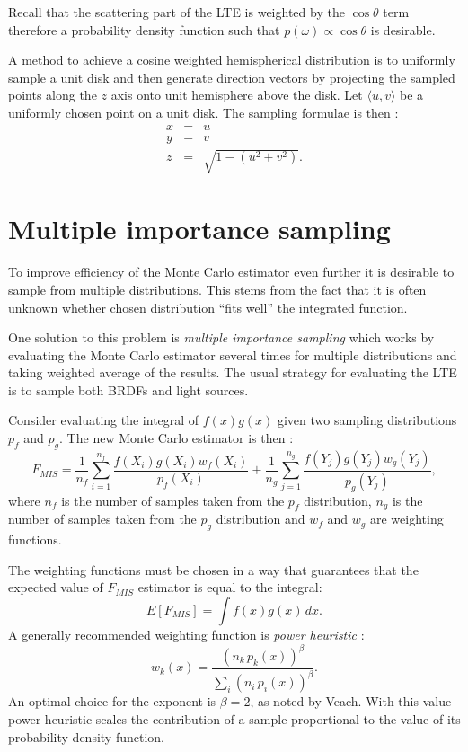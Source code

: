 Recall that the scattering part of the LTE is weighted by the $\cos\theta$ term therefore a probability density function such that $p(\omega) \propto \cos\theta$ is desirable.

A method to achieve a cosine weighted hemispherical distribution is to uniformly sample a unit disk and then generate direction vectors by projecting the sampled points along the $z$ axis onto unit hemisphere above the disk.
Let $\langle u, v \rangle$ be a uniformly chosen point on a unit disk. The sampling formulae is then \parencite{shirley97}:
\begin{eqnarray}
  x &=& u \nonumber \\
  y &=& v \nonumber \\
  z &=& \sqrt{1 - (u^{2} + v^{2})}.
\end{eqnarray}

\section{Multiple importance sampling}
To improve efficiency of the Monte Carlo estimator even further it is desirable to sample from multiple distributions. This stems from the fact that it is often unknown whether chosen distribution ``fits well'' the integrated function.

One solution to this problem is \emph{multiple importance sampling} which works by evaluating the Monte Carlo estimator several times for multiple distributions and taking weighted average of the results. The usual strategy for evaluating the LTE is to sample both BRDFs and light sources.

Consider evaluating the integral of $f(x)g(x)$ given two sampling distributions $p_{f}$ and $p_{g}$. The new Monte Carlo estimator is then \parencite{phar2010}:
\begin{equation}
  F_{MIS} = 
  \frac{1}{n_{f}} \sum_{i=1}^{n_{f}} \frac{f(X_{i})g(X_{i})w_{f}(X_{i})}{p_{f}(X_{i})} + 
  \frac{1}{n_{g}} \sum_{j=1}^{n_{g}} \frac{f(Y_{j})g(Y_{j})w_{g}(Y_{j})}{p_{g}(Y_{j})},
\end{equation}
where $n_{f}$ is the number of samples taken from the $p_{f}$ distribution, $n_{g}$ is the number of samples taken from the $p_{g}$ distribution and $w_{f}$ and $w_{g}$ are weighting functions.

The weighting functions must be chosen in a way that guarantees that the expected value of $F_{MIS}$ estimator is equal to the integral:
\begin{equation}
  E[F_{MIS}] = \int f(x)g(x) \,dx.
\end{equation}
A generally recommended weighting function is \emph{power heuristic} \parencite{veach97}:
\begin{equation}
  w_{k}(x) = \frac{(n_{k}\,p_{k}(x))^{\beta}}{\sum_{i}(n_{i}\,p_{i}(x))^{\beta}}.
\end{equation}
An optimal choice for the exponent is $\beta = 2$, as noted by Veach. With this value power heuristic scales the contribution of a sample proportional to the value of its probability density function.

